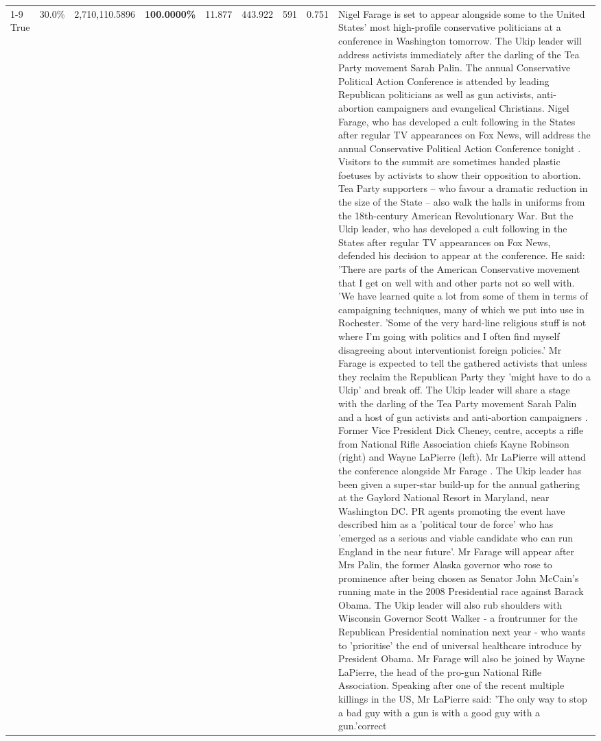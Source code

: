 \begin{table}[H]
\begin{tabular}{lllrlllll}
\cline{1-9}
True & 30.0\% & 2,710,110.5896 & \bfseries \color{red} 100.0000\% & 11.877 & 443.922 & 591 & 0.751 & Nigel Farage is set to appear alongside some to the United States' most high-profile conservative politicians at a conference in Washington tomorrow. The Ukip leader will address activists immediately after the darling of the Tea Party movement Sarah Palin. The annual Conservative Political Action Conference is attended by leading Republican politicians as well as gun activists, anti-abortion campaigners and evangelical Christians. Nigel Farage, who has developed a cult following in the States after regular TV appearances on Fox News, will address the annual Conservative Political Action Conference tonight . Visitors to the summit are sometimes handed plastic foetuses by activists to show their opposition to abortion. Tea Party supporters – who favour a dramatic reduction in the size of the State – also walk the halls in uniforms from the 18th-century American Revolutionary War. But the Ukip leader, who has developed a cult following in the States after regular TV appearances on Fox News, defended his decision to appear at the conference. He said: 'There are parts of the American Conservative movement that I get on well with and other parts not so well with. 'We have learned quite a lot from some of them in terms of campaigning techniques, many of which we put into use in Rochester. 'Some of the very hard-line religious stuff is not where I'm going with politics and I often find myself disagreeing about interventionist foreign policies.' Mr Farage is expected to tell the gathered activists that unless they reclaim the Republican Party they 'might have to do a Ukip' and break off. The Ukip leader will share a stage with the darling of the Tea Party movement Sarah Palin and a host of gun activists and anti-abortion campaigners . Former Vice President Dick Cheney, centre, accepts a rifle from National Rifle Association chiefs Kayne Robinson (right) and Wayne LaPierre (left). Mr LaPierre will attend the conference alongside Mr Farage . The Ukip leader has been given a super-star build-up for the annual gathering at the Gaylord National Resort in Maryland, near Washington DC. PR agents promoting the event have described him as a 'political tour de force' who has 'emerged as a serious and viable candidate who can run England in the near future'. Mr Farage will appear after Mrs Palin, the former Alaska governor who rose to prominence after being chosen as Senator John McCain's running mate in the 2008 Presidential race against Barack Obama. The Ukip leader will also rub shoulders with Wisconsin Governor Scott Walker - a frontrunner for the Republican Presidential nomination next year - who wants to 'prioritise' the end of universal healthcare introduce by President Obama. Mr Farage will also be joined by Wayne LaPierre, the head of the pro-gun National Rifle Association. Speaking after one of the recent multiple killings in the US, Mr LaPierre said: 'The only way to stop a bad guy with a gun is with a good guy with a gun.'correct \\

\end{tabular}
\end{table}
